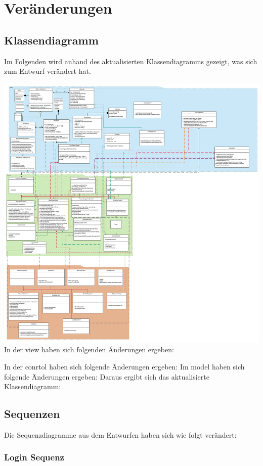 \section{Veränderungen}
\subsection{Klassendiagramm}
Im Folgenden wird anhand des aktualisierten Klassendiagramms gezeigt, was sich zum Entwurf verändert hat.

\includegraphics{Class Diagramm_alt.svg}
In der view haben sich folgenden Änderungen ergeben:

In der conrtol haben sich folgende Änderungen ergeben:
Im model haben sich folgende Änderungen ergeben: %
Daraus ergibt sich das aktualisierte Klassendiagramm:


\subsection{Sequenzen}
Die Sequenzdiagramme aus dem Entwurfen haben sich wie folgt verändert:
\subsubsection{Login Sequenz}

